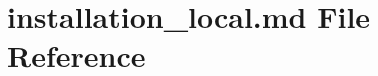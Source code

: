 \hypertarget{installation__local_8md}{}\section{installation\+\_\+local.\+md File Reference}
\label{installation__local_8md}
